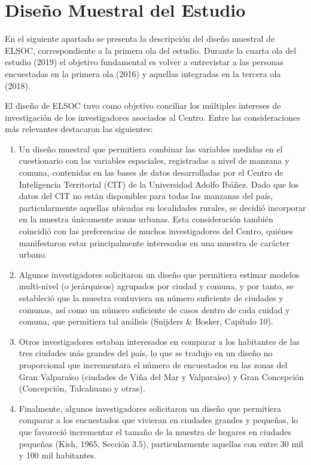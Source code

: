 \documentclass[
]{book}
\begin{document}
\hypertarget{diseuxf1o-muestral-del-estudio}{%
\chapter{Diseño Muestral del Estudio}\label{diseuxf1o-muestral-del-estudio}}

En el siguiente apartado se presenta la descripción del diseño muestral de ELSOC, correspondiente a la primera ola del estudio. Durante la cuarta ola del estudio (2019) el objetivo fundamental es volver a entrevistar a las personas encuestadas en la primera ola (2016) y aquellas integradas en la tercera ola (2018).

El diseño de ELSOC tuvo como objetivo conciliar los múltiples intereses de investigación de los investigadores asociados al Centro. Entre las consideraciones más relevantes destacaron las siguientes:

\begin{enumerate}
\def\labelenumi{\arabic{enumi}.}
\item
  Un diseño muestral que permitiera combinar las variables medidas en el cuestionario con las variables espaciales, registradas a nivel de manzana y comuna, contenidas en las bases de datos desarrolladas por el Centro de Inteligencia Territorial (CIT) de la Universidad Adolfo Ibáñez. Dado que los datos del CIT no están disponibles para todas las manzanas del país, particularmente aquellas ubicadas en localidades rurales, se decidió incorporar en la muestra únicamente zonas urbanas. Esta consideración también coincidió con las preferencias de muchos investigadores del Centro, quiénes manifestaron estar principalmente interesados en una muestra de carácter urbano.
\item
  Algunos investigadores solicitaron un diseño que permitiera estimar modelos multi-nivel (o jerárquicos) agrupados por ciudad y comuna, y por tanto, se estableció que la muestra contuviera un número suficiente de ciudades y comunas, así como un número suficiente de casos dentro de cada cuidad y comuna, que permitiera tal análisis (Snijders \& Bosker, Capítulo 10).
\item
  Otros investigadores estaban interesados en comparar a los habitantes de las tres ciudades más grandes del país, lo que se tradujo en un diseño no proporcional que incrementara el número de encuestados en las zonas del Gran Valparaíso (ciudades de Viña del Mar y Valparaíso) y Gran Concepción (Concepción, Talcahuano y otras).
\item
  Finalmente, algunos investigadores solicitaron un diseño que permitiera comparar a los encuestados que vivieran en ciudades grandes y pequeñas, lo que favoreció incrementar el tamaño de la muestra de hogares en ciudades pequeñas (Kish, 1965, Sección 3.5), particularmente aquellas con entre 30 mil y 100 mil habitantes.
\end{enumerate}
\end{document}
